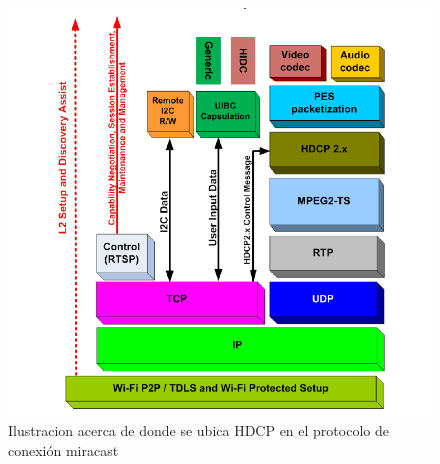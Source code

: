 \begin{figure}[ht]
  \begin{centering}
    \includegraphics[width=1.0\textwidth]{./Imagenes/HDCP_miracast_layers.png}
    \caption{Ilustracion acerca de donde se ubica HDCP en el protocolo de conexión miracast}
  \end{centering}
\end{figure}
